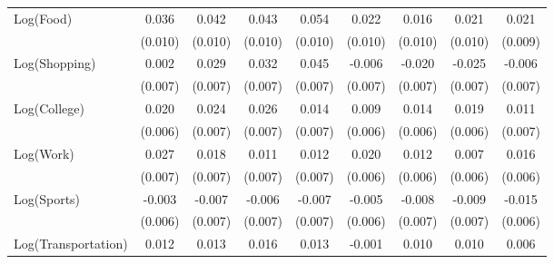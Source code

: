 {\begin{tabular}{l*{8}{c}}
Log(Food)           &       0.036\sym{***}&       0.042\sym{***}&       0.043\sym{***}&       0.054\sym{***}&       0.022\sym{**} &       0.016         &       0.021\sym{**} &       0.021\sym{**} \\
                    &     (0.010)         &     (0.010)         &     (0.010)         &     (0.010)         &     (0.010)         &     (0.010)         &     (0.010)         &     (0.009)         \\
Log(Shopping)       &       0.002         &       0.029\sym{***}&       0.032\sym{***}&       0.045\sym{***}&      -0.006         &      -0.020\sym{***}&      -0.025\sym{***}&      -0.006         \\
                    &     (0.007)         &     (0.007)         &     (0.007)         &     (0.007)         &     (0.007)         &     (0.007)         &     (0.007)         &     (0.007)         \\
Log(College)        &       0.020\sym{***}&       0.024\sym{***}&       0.026\sym{***}&       0.014\sym{*}  &       0.009         &       0.014\sym{**} &       0.019\sym{***}&       0.011         \\
                    &     (0.006)         &     (0.007)         &     (0.007)         &     (0.007)         &     (0.006)         &     (0.006)         &     (0.006)         &     (0.007)         \\
Log(Work)           &       0.027\sym{***}&       0.018\sym{**} &       0.011\sym{*}  &       0.012\sym{*}  &       0.020\sym{***}&       0.012\sym{**} &       0.007         &       0.016\sym{**} \\
                    &     (0.007)         &     (0.007)         &     (0.007)         &     (0.007)         &     (0.006)         &     (0.006)         &     (0.006)         &     (0.006)         \\
Log(Sports)         &      -0.003         &      -0.007         &      -0.006         &      -0.007         &      -0.005         &      -0.008         &      -0.009         &      -0.015\sym{**} \\
                    &     (0.006)         &     (0.007)         &     (0.007)         &     (0.007)         &     (0.006)         &     (0.007)         &     (0.007)         &     (0.006)         \\
Log(Transportation) &       0.012\sym{*}  &       0.013\sym{*}  &       0.016\sym{**} &       0.013\sym{*}  &      -0.001         &       0.010         &       0.010         &       0.006         \\

\end{tabular}}
